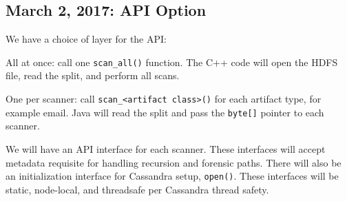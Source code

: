 \documentclass[12pt,twoside]{article}
\begin{document}
\subsection{March 2, 2017: API Option}
We have a choice of layer for the API:
\begin{compactitem}
\item All at once: call one \verb+scan_all()+ function.  The C++ code will open the HDFS file, read the split, and perform all scans.
\item One per scanner: call \verb+scan_<artifact class>()+ for each artifact type, for example email. Java will read the split and pass the \verb+byte[]+ pointer to each scanner.
\end{compactitem}
We will have an API interface for each scanner. These interfaces will accept metadata requisite for handling recursion and forensic paths.
There will also be an initialization interface for Cassandra setup, \verb+open()+. These interfaces will be static, node-local, and threadsafe per Cassandra thread safety.
\end{document}
